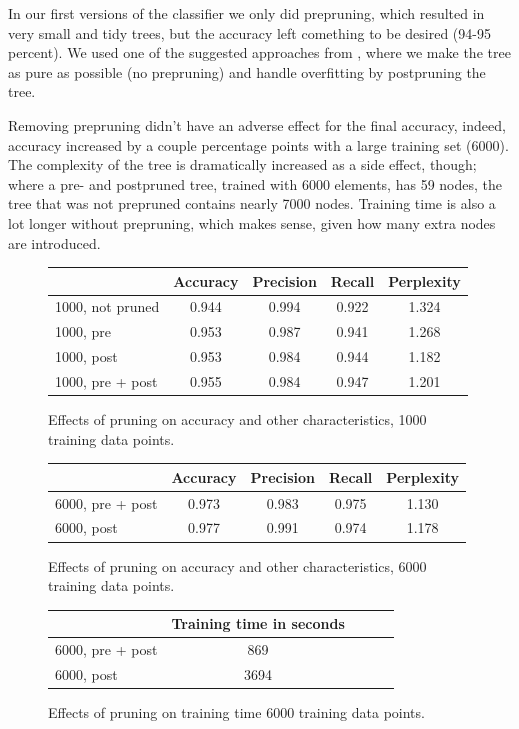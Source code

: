 \documentclass[a4paper,10pt]{article}
\begin{document}
In our first versions of the classifier we only did prepruning, which
resulted in very small and tidy trees, but the accuracy left comething
to be desired (94-95 percent).  We used one of the suggested
approaches from \cite{alpaydin2004}, where we make the tree as pure as
possible (no prepruning) and handle overfitting by postpruning the tree.

Removing prepruning didn't have an adverse effect for the final
accuracy, indeed, accuracy increased by a couple percentage points with
a large training set (6000).  The complexity of the tree is dramatically
increased as a side effect, though; where a pre- and postpruned tree,
trained with 6000 elements, has 59 nodes, the tree that was not
prepruned contains nearly 7000 nodes.  Training time is also a lot
longer without prepruning, which makes sense, given how many extra nodes
are introduced.

\begin{figure}
  \centering
\begin{tabular}{|l|c|c|c|c|}
\hline
 & Accuracy & Precision & Recall & Perplexity \\ \hline
1000, not pruned &  0.944 & 0.994 & 0.922 & 1.324 \\
1000, pre & 0.953 & 0.987 & 0.941 & 1.268 \\
1000, post & 0.953 & 0.984 &  0.944 & 1.182 \\
1000, pre + post &  0.955 & 0.984 & 0.947 & 1.201 \\
\hline
\end{tabular}
  \caption{Effects of pruning on accuracy and other characteristics,
    1000 training data points.}
  \label{fig:pruning} 
\end{figure}

\begin{figure}
  \centering
\begin{tabular}{|l|c|c|c|c|}
\hline
 & Accuracy & Precision & Recall & Perplexity \\ \hline
6000, pre + post & 0.973 & 0.983 & 0.975 & 1.130 \\
6000, post & 0.977 & 0.991 & 0.974 & 1.178 \\
\hline
\end{tabular}
  \caption{Effects of pruning on accuracy and other characteristics,
    6000 training data points.}
  \label{fig:pruning6000} 
\end{figure}


\begin{figure}
  \centering
\begin{tabular}{|l|c|c|c|c|}
\hline
 & Training time in seconds \\ \hline
6000, pre + post & 869 \\
6000, post & 3694 \\
\hline
\end{tabular}
\caption{Effects of pruning on training time 6000 training data points.}
  \label{fig:pruning6000-training-time} 
\end{figure}
\end{document}
